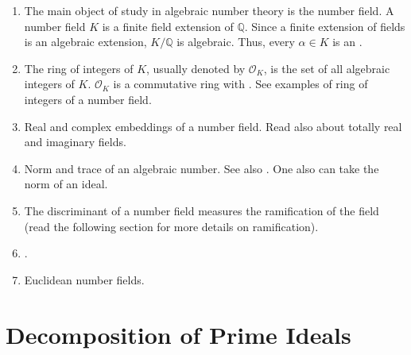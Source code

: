 \documentclass[12pt]{article}
\newcommand{\Rats}{\mathbb{Q}}
\begin{document}
\begin{enumerate}
\item The main object of study in algebraic number theory is the number field. A number field $K$ is a finite field extension of $\Rats$. Since a finite extension of fields is an algebraic extension, $K/\Rats$ is algebraic. Thus, every $\alpha\in K$ is an .
\item The ring of integers of $K$, usually denoted by $\mathcal{O}_K$, is the set of all algebraic integers of $K$. $\mathcal{O}_K$ is a commutative ring with . See examples of ring of integers of a number field.
\item Real and complex embeddings of a number field. Read also about totally real and imaginary fields.
\item Norm and trace of an algebraic number. See also . One also can take the norm of an ideal.
\item The discriminant of a number field measures the ramification of the field (read the following section for more details on ramification).
\item {}.

\item Euclidean number fields.
\end{enumerate}

\section{Decomposition of Prime Ideals}
\end{document}
